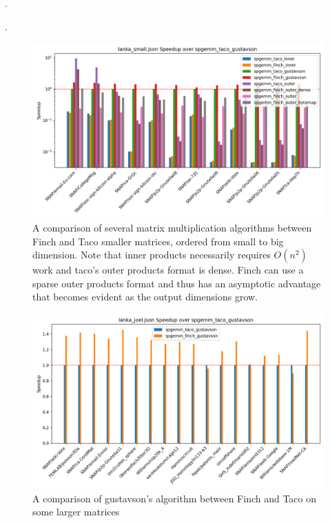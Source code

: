 
.

.
\begin{figure}
    \label{spgemm_small}
	\includegraphics[width=\linewidth]{spgemm_small_speedup_log_scale.png}
    \caption{A comparison of several matrix multiplication algorithms between Finch and Taco smaller matrices, ordered from small to big dimension. Note that inner products necessarily requires $O(n^2)$ work and taco's outer products format is dense. Finch can use a sparse outer products format and thus has an asymptotic advantage that becomes evident as the output dimensions grow.}
\end{figure}

\begin{figure}
\label{spgemm_large}
	\includegraphics[width=\linewidth]{spgemm_joel_speedup.png}
    \caption{A comparison of gustavson's algorithm between Finch and Taco on some larger matrices}
\end{figure}

